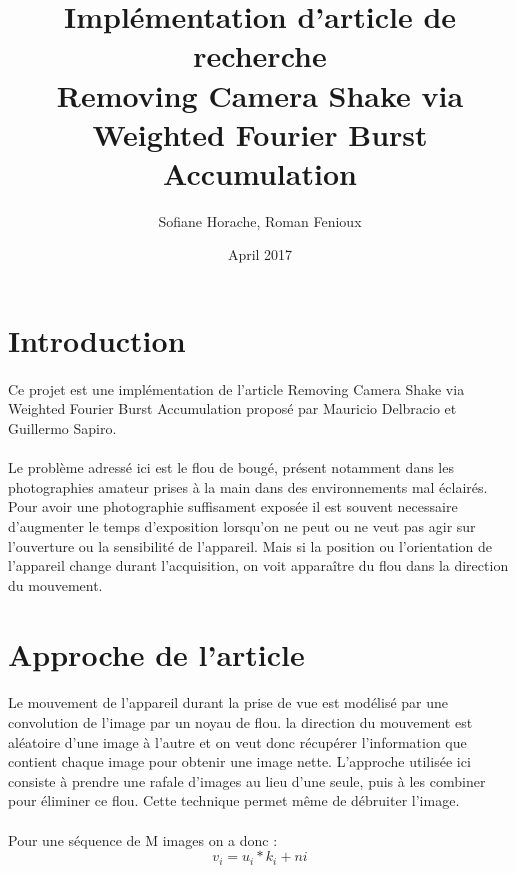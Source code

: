 \documentclass[a4paper,10pt]{report}
\title{Implémentation d'article de recherche \\ 
Removing Camera Shake via Weighted Fourier Burst Accumulation}
\author{Sofiane Horache, Roman Fenioux}
\date{April 2017}
\begin{document}
\maketitle


\setcounter{secnumdepth}{0}

\section{Introduction}
\paragraph{}
Ce projet est une implémentation de l'article Removing Camera Shake via Weighted Fourier Burst Accumulation
proposé par Mauricio Delbracio et Guillermo Sapiro. \\


\paragraph{}
Le problème adressé ici est le flou de bougé, présent notamment dans les photographies 
amateur prises à la main dans des environnements mal éclairés. Pour avoir une photographie 
suffisament exposée il est souvent necessaire d'augmenter le temps d'exposition lorsqu'on 
ne peut ou ne veut pas agir sur l'ouverture ou la sensibilité de l'appareil. Mais si la 
position ou l'orientation de l'appareil change durant l'acquisition, on voit apparaître du flou dans la direction
du mouvement. 

\section{Approche de l'article}
\paragraph{}
Le mouvement de l'appareil durant la prise de vue est modélisé par une convolution de l'image
par un noyau de flou. la direction du mouvement est aléatoire d'une image à l'autre et on veut donc 
récupérer l'information que contient chaque image pour obtenir une image nette. L'approche utilisée 
ici consiste à prendre une rafale d'images au lieu d'une seule, puis à les combiner pour éliminer ce 
flou. Cette technique permet même de débruiter l'image. 
\paragraph{}
Pour une séquence de M images on a donc :
\[
  v_{i} = u_{i} \ast k_{i} + n{i}
\]
\end{document}

